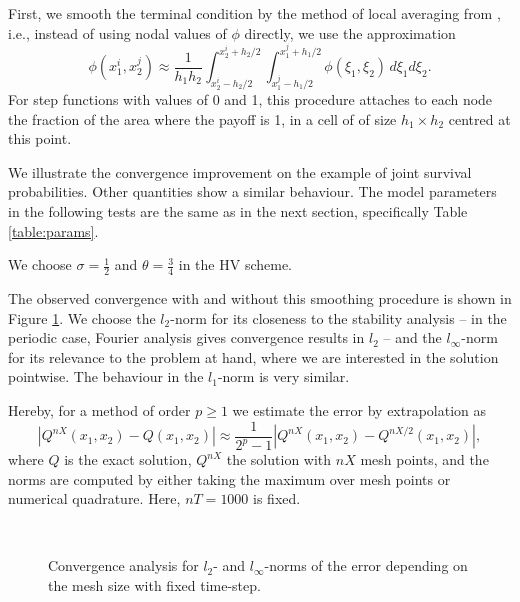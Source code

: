 {First, we smooth the terminal condition by the method of local averaging from \cite{pooley2003}, i.e., instead of using nodal values of $\phi$ directly, we use the approximation
\[
\phi(x_1^i,x_2^j) \approx \frac{1}{h_1 h_2} \int_{x_2^i-h_2/2}^{x_2^i+h_2/2} \int_{x_1^j-h_1/2}^{x_1^j+h_1/2}
\phi(\xi_1,\xi_2) \, d\xi_1 d\xi_2.
\]
For step functions with values of 0 and 1, this procedure attaches to each node the fraction of the area where the payoff is 1, in a cell of of size $h
_1 \times h_2$ centred at this point.

We illustrate the convergence improvement on the example of joint survival probabilities. Other quantities show a similar behaviour.
The model parameters in the following tests are the same as in the next section, specifically Table \ref{table:params}.

We choose $\sigma = \frac{1}{2}$ and $\theta = \frac{3}{4}$ in the HV scheme. 

The observed convergence with and without this smoothing procedure is shown in Figure \ref{fig_conv1}.
We choose the $l_2$-norm for its closeness to the stability analysis -- in the periodic case, Fourier analysis gives convergence results in $l_2$ -- and the  $l_\infty$-norm for its relevance to the problem at hand, where we are interested in the solution pointwise.
The behaviour in the $l_1$-norm is very similar.

Hereby, for a method of order $p\ge 1$ we estimate the error by extrapolation as
\begin{equation*}
|Q^{nX}(x_1, x_2) - Q(x_1, x_2)| \approx \frac{1}{2^p-1}  |Q^{nX}(x_1, x_2) - Q^{nX/2}(x_1, x_2)|,
\end{equation*}
where $Q$ is the exact solution, $Q^{nX}$ the solution with $nX$ mesh points,
and the norms are computed by either taking the maximum over mesh points or numerical quadrature.
Here, $nT=1000$ is fixed.



\begin{figure}[H]
	\begin{center}
				 \hfill
				\\
	\end{center}		
	\vspace{-20pt}
	\caption{Convergence analysis for $l_2$- and $l_{\infty}$-norms of the error depending on the mesh size with fixed time-step.}
 	\label{fig_conv1}
\end{figure}

}
